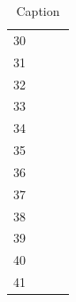 \documentclass[12pt, a4paper]{article}
\begin{document}
\begin{table}[h!]
\begin{tabular}{|c|c|c|c|}
         \footnotesize 30 & & & \\
         \footnotesize 31 & & & \\
         \footnotesize 32 & & & \\ 
         \footnotesize 33 & & & \\
         \footnotesize 34 & & & \\
         \footnotesize 35 & & & \\
         \footnotesize 36 & & & \\
         \footnotesize 37 & & & \\
         \footnotesize 38 & & & \\
         \footnotesize 39 & & & \\
         \footnotesize 40 & & & \\
         \footnotesize 41 & & & \\
    \hline
         
    \end{tabular}
    \caption{Caption}
    \label{Tabella Completa}
\end{table}
\end{document}
